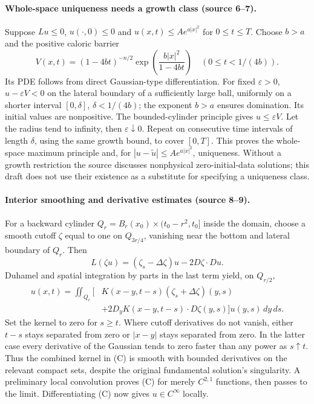 \paragraph{Whole-space uniqueness needs a growth class (source 6--7).}
Suppose $Lu\leq0$, $u(\cdot,0)\leq0$ and
$u(x,t)\leq A e^{a|x|^2}$ for $0\leq t\leq T$.
Choose $b>a$ and the positive caloric barrier
\[
 V(x,t)=(1-4bt)^{-n/2}
                 \exp\left(\frac{b|x|^2}{1-4bt}\right)
 \quad(0\leq t<1/(4b)).
\]
Its PDE follows from direct Gaussian-type differentiation.
For fixed $\varepsilon>0$, $u-\varepsilon V<0$ on the lateral
boundary of a sufficiently large ball, uniformly on a shorter interval
$[0,\delta]$, $\delta<1/(4b)$; the exponent $b>a$ ensures domination.
Its initial values are nonpositive. The bounded-cylinder principle
gives $u\leq\varepsilon V$. Let the radius tend to infinity, then
$\varepsilon\downarrow0$. Repeat on consecutive time intervals of
length $\delta$, using the same growth bound, to cover $[0,T]$.
This proves the whole-space maximum principle and, for
$|u-\widetilde u|\leq A e^{a|x|^2}$, uniqueness.
Without a growth restriction the source discusses nonphysical
zero-initial-data solutions; this draft does not use their existence
as a substitute for specifying a uniqueness class.

\paragraph{Interior smoothing and derivative estimates (source 8--9).}
For a backward cylinder
$Q_r=B_r(x_0)\times(t_0-r^2,t_0]$ inside the domain,
choose a smooth cutoff $\zeta$ equal to one on $Q_{3r/4}$,
vanishing near the bottom and lateral boundary of $Q_r$.
Then
\[
 L(\zeta u)=(\zeta_s-\Delta\zeta)u-2D\zeta\cdot Du.
\]
Duhamel and spatial integration by parts in the last term yield,
on $Q_{r/2}$,
\[
 \begin{split}
 u(x,t)=\iint_{Q_r}\bigl[
 &K(x-y,t-s)(\zeta_s+\Delta\zeta)(y,s)\\
 &+2D_yK(x-y,t-s)\cdot D\zeta(y,s)
 \bigr]u(y,s)\,dy\,ds.
 \end{split}
 \tag{C}
\]
Set the kernel to zero for $s\geq t$.
Where cutoff derivatives do not vanish, either $t-s$ stays separated
from zero or $|x-y|$ stays separated from zero.
In the latter case every derivative of the Gaussian tends to zero
faster than any power as $s\uparrow t$.
Thus the combined kernel in (C) is smooth with bounded derivatives
on the relevant compact sets, despite the original fundamental
solution's singularity. A preliminary local convolution proves (C)
for merely $C^{2,1}$ functions, then passes to the limit.
Differentiating (C) now gives $u\in C^\infty$ locally.


